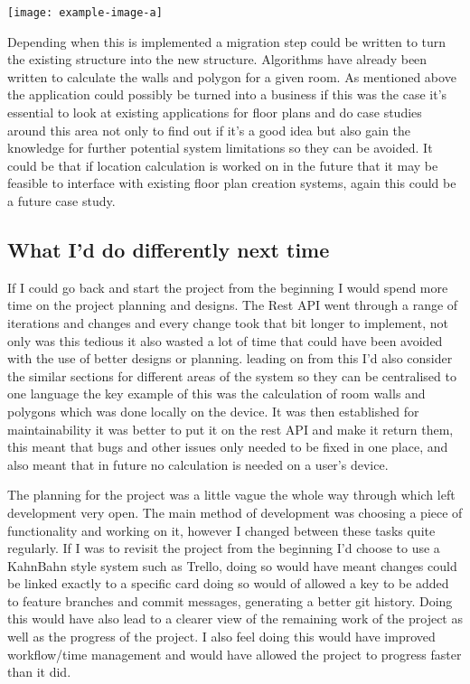 \begin{center}
	\texttt{[image: example-image-a]}
\end{center}

Depending when this is implemented a migration step could be written to turn the existing structure into the new structure. Algorithms have already been written to calculate the walls and polygon for a given room. As mentioned above the application could possibly be turned into a business if this was the case it's essential to look at existing applications for floor plans and do case studies around this area not only to find out if it's a good idea but also gain the knowledge for further potential system limitations so they can be avoided. It could be that if location calculation is worked on in the future that it may be feasible to interface with existing floor plan creation systems, again this could be a future case study.

\subsection{What I'd do differently next time}
If I could go back and start the project from the beginning I would spend more time on the project planning and designs. The Rest API went through a range of iterations and changes and every change took that bit longer to implement, not only was this tedious it also wasted a lot of time that could have been avoided with the use of better designs or planning. leading on from this I'd also consider the similar sections for different areas of the system so they can be centralised to one language the key example of this was the calculation of room walls and polygons which was done locally on the device. It was then established for maintainability it was better to put it on the rest API and make it return them, this meant that bugs and other issues only needed to be fixed in one place, and also meant that in future no calculation is needed on a user's device.

The planning for the project was a little vague the whole way through which left development very open. The main method of development was choosing a piece of functionality and working on it, however I changed between these tasks quite regularly. If I was to revisit the project from the beginning I'd choose to use a KahnBahn style system such as Trello, doing so would have meant changes could be linked exactly to a specific card doing so would of allowed a key to be added to feature branches and commit messages, generating a better git history. Doing this would have also lead to a clearer view of the remaining work of the project as well as the progress of the project. I also feel doing this would have improved workflow/time management and would have allowed the project to progress faster than it did. 


